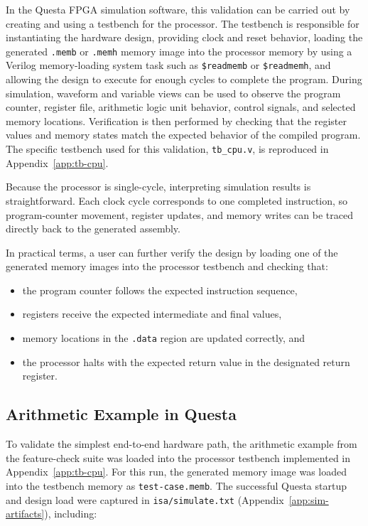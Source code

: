 \documentclass[12pt]{report}
\begin{document}
In the Questa FPGA simulation software, this validation can be carried out by creating and using a
testbench for the processor. The testbench is responsible for instantiating
the hardware design, providing clock and reset behavior, loading the generated
\texttt{.memb} or \texttt{.memh} memory image into the processor memory by
using a Verilog memory-loading system task such as \texttt{\$readmemb} or
\texttt{\$readmemh}, and allowing the design to execute for enough cycles to
complete the program. During simulation, waveform and variable views can be
used to observe the program counter, register file, arithmetic logic unit
behavior, control signals, and selected memory locations. Verification is then
performed by checking that the register values and memory states match the
expected behavior of the compiled program. The specific testbench used for this
validation, \texttt{tb\_cpu.v}, is reproduced in Appendix~\ref{app:tb-cpu}.

Because the processor is single-cycle, interpreting simulation results is
straightforward. Each clock cycle corresponds to one completed instruction, so
program-counter movement, register updates, and memory writes can be traced
directly back to the generated assembly.

In practical terms, a user can further verify the design by loading one of the
generated memory images into the processor testbench and checking that:

\begin{itemize}
    \item the program counter follows the expected instruction sequence,
    \item registers receive the expected intermediate and final values,
    \item memory locations in the \texttt{.data} region are updated correctly,
          and
    \item the processor halts with the expected return value in the designated
          return register.
\end{itemize}

\subsection{Arithmetic Example in Questa}
\label{sec:questa-arith}

To validate the simplest end-to-end hardware path, the arithmetic example from
the feature-check suite was loaded into the processor testbench implemented in
Appendix~\ref{app:tb-cpu}. For this run, the generated memory image was loaded
into the testbench memory as \texttt{test-case.memb}. The successful Questa
startup and design load were captured in \texttt{isa/simulate.txt}
(Appendix~\ref{app:sim-artifacts}), including:
\end{document}
